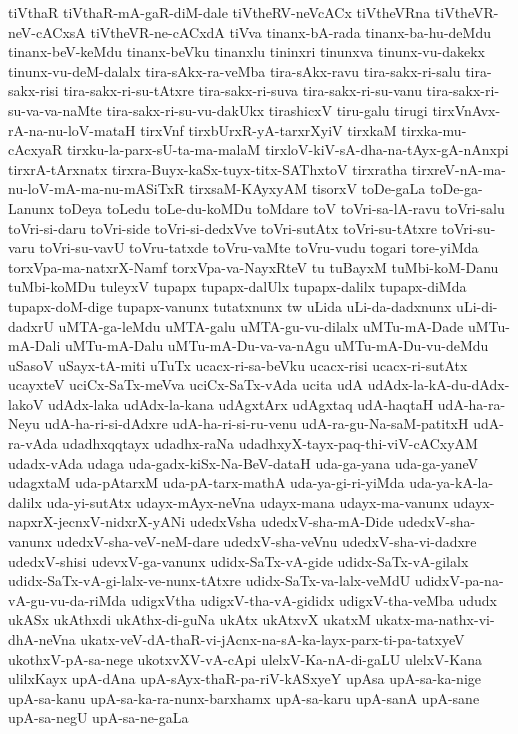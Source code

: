 {tiVthaR
tiVthaR-mA-gaR-diM-dale
tiVtheRV-neVcACx
tiVtheVRna
tiVtheVR-neV-cACxsA
tiVtheVR-ne-cACxdA
tiVva
tinanx-bA-rada
tinanx-ba-hu-deMdu
tinanx-beV-keMdu
tinanx-beVku
tinanxlu
tininxri
tinunxva
tinunx-vu-dakekx
tinunx-vu-deM-dalalx
tira-sAkx-ra-veMba
tira-sAkx-ravu
tira-sakx-ri-salu
tira-sakx-risi
tira-sakx-ri-su-tAtxre
tira-sakx-ri-suva
tira-sakx-ri-su-vanu
tira-sakx-ri-su-va-va-naMte
tira-sakx-ri-su-vu-dakUkx
tirashicxV
tiru-galu
tirugi
tirxVnAvx-rA-na-nu-loV-mataH
tirxVnf
tirxbUrxR-yA-tarxrXyiV
tirxkaM
tirxka-mu-cAcxyaR
tirxku-la-parx-sU-ta-ma-malaM
tirxloV-kiV-sA-dha-na-tAyx-gA-nAnxpi
tirxrA-tArxnatx
tirxra-Buyx-kaSx-tuyx-titx-SAThxtoV
tirxratha
tirxreV-nA-ma-nu-loV-mA-ma-nu-mASiTxR
tirxsaM-KAyxyAM
tisorxV
toDe-gaLa
toDe-ga-Lanunx
toDeya
toLedu
toLe-du-koMDu
toMdare
toV
toVri-sa-lA-ravu
toVri-salu
toVri-si-daru
toVri-side
toVri-si-dedxVve
toVri-sutAtx
toVri-su-tAtxre
toVri-su-varu
toVri-su-vavU
toVru-tatxde
toVru-vaMte
toVru-vudu
togari
tore-yiMda
torxVpa-ma-natxrX-Namf
torxVpa-va-NayxRteV
tu
tuBayxM
tuMbi-koM-Danu
tuMbi-koMDu
tuleyxV
tupapx
tupapx-dalUlx
tupapx-dalilx
tupapx-diMda
tupapx-doM-dige
tupapx-vanunx
tutatxnunx
tw
uLida
uLi-da-dadxnunx
uLi-di-dadxrU
uMTA-ga-leMdu
uMTA-galu
uMTA-gu-vu-dilalx
uMTu-mA-Dade
uMTu-mA-Dali
uMTu-mA-Dalu
uMTu-mA-Du-va-va-nAgu
uMTu-mA-Du-vu-deMdu
uSasoV
uSayx-tA-miti
uTuTx
ucacx-ri-sa-beVku
ucacx-risi
ucacx-ri-sutAtx
ucayxteV
uciCx-SaTx-meVva
uciCx-SaTx-vAda
ucita
udA
udAdx-la-kA-du-dAdx-lakoV
udAdx-laka
udAdx-la-kana
udAgxtArx
udAgxtaq
udA-haqtaH
udA-ha-ra-Neyu
udA-ha-ri-si-dAdxre
udA-ha-ri-si-ru-venu
udA-ra-gu-Na-saM-patitxH
udA-ra-vAda
udadhxqqtayx
udadhx-raNa
udadhxyX-tayx-paq-thi-viV-cACxyAM
udadx-vAda
udaga
uda-gadx-kiSx-Na-BeV-dataH
uda-ga-yana
uda-ga-yaneV
udagxtaM
uda-pAtarxM
uda-pA-tarx-mathA
uda-ya-gi-ri-yiMda
uda-ya-kA-la-dalilx
uda-yi-sutAtx
udayx-mAyx-neVna
udayx-mana
udayx-ma-vanunx
udayx-napxrX-jecnxV-nidxrX-yANi
udedxVsha
udedxV-sha-mA-Dide
udedxV-sha-vanunx
udedxV-sha-veV-neM-dare
udedxV-sha-veVnu
udedxV-sha-vi-dadxre
udedxV-shisi
udevxV-ga-vanunx
udidx-SaTx-vA-gide
udidx-SaTx-vA-gilalx
udidx-SaTx-vA-gi-lalx-ve-nunx-tAtxre
udidx-SaTx-va-lalx-veMdU
udidxV-pa-na-vA-gu-vu-da-riMda
udigxVtha
udigxV-tha-vA-gididx
udigxV-tha-veMba
ududx
ukASx
ukAthxdi
ukAthx-di-guNa
ukAtx
ukAtxvX
ukatxM
ukatx-ma-nathx-vi-dhA-neVna
ukatx-veV-dA-thaR-vi-jAcnx-na-sA-ka-layx-parx-ti-pa-tatxyeV
ukothxV-pA-sa-nege
ukotxvXV-vA-cApi
ulelxV-Ka-nA-di-gaLU
ulelxV-Kana
ulilxKayx
upA-dAna
upA-sAyx-thaR-pa-riV-kASxyeY
upAsa
upA-sa-ka-nige
upA-sa-kanu
upA-sa-ka-ra-nunx-barxhamx
upA-sa-karu
upA-sanA
upA-sane
upA-sa-negU
upA-sa-ne-gaLa
}
